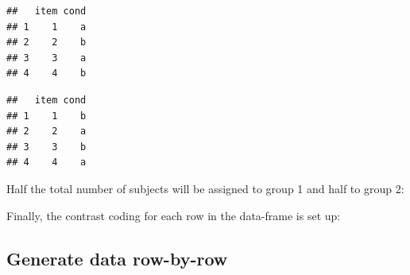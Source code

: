 \documentclass[12pt,]{krantz}
\newenvironment{Shaded}{\begin{snugshade}}{\end{snugshade}}
\newcommand{\CommentTok}[1]{\textcolor[rgb]{0.56,0.35,0.01}{\textit{#1}}}
\newcommand{\DataTypeTok}[1]{\textcolor[rgb]{0.13,0.29,0.53}{#1}}
\newcommand{\DecValTok}[1]{\textcolor[rgb]{0.00,0.00,0.81}{#1}}
\newcommand{\KeywordTok}[1]{\textcolor[rgb]{0.13,0.29,0.53}{\textbf{#1}}}
\newcommand{\NormalTok}[1]{#1}
\newcommand{\OperatorTok}[1]{\textcolor[rgb]{0.81,0.36,0.00}{\textbf{#1}}}
\newcommand{\StringTok}[1]{\textcolor[rgb]{0.31,0.60,0.02}{#1}}
\begin{document}
\begin{verbatim}
##   item cond
## 1    1    a
## 2    2    b
## 3    3    a
## 4    4    b
\end{verbatim}

\begin{verbatim}
##   item cond
## 1    1    b
## 2    2    a
## 3    3    b
## 4    4    a
\end{verbatim}

Half the total number of subjects will be assigned to group 1 and half to group 2:

\begin{Shaded}
\end{Shaded}

Finally, the contrast coding for each row in the data-frame is set up:

\begin{Shaded}
\end{Shaded}

\hypertarget{generate-data-row-by-row}{%
\subsection{Generate data row-by-row}\label{generate-data-row-by-row}}
\end{document}
